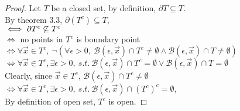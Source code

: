 \documentclass[]{article}
\newcommand{\ball}[2]{\mathcal{B}({#1}, {#2})}
\begin{document}
	\begin{proof}
		Let $T$ be a closed set, by definition, $\partial T \subseteq T$. \\
		By theorem 3.3, $\partial(T^c) \subseteq T$, \\
		$\iff \partial {T^c} \centernot \subseteq T^c$ \\
		$\iff$ no points in $T^c$ is boundary point \\
		$\iff \forall \vec{x} \in T^c,\ \neg(\forall \epsilon > 0,\ \ball{\epsilon}{\vec{x}} \cap T^c \neq \emptyset \land \ball{\epsilon}{\vec{x}} \cap T \neq \emptyset)$ \\
		$\iff \forall \vec{x} \in T^c, \exists \epsilon > 0,\ s.t.\ \ball{\epsilon}{\vec{x}} \cap T^c = \emptyset \lor \ball{\epsilon}{\vec{x}} \cap T = \emptyset$ \\
		Clearly, since $\vec{x} \in T^c$, $\ball{\epsilon}{\vec{x}} \cap T^c \neq \emptyset$ \\
		$\iff \forall \vec{x} \in T^c, \exists \epsilon > 0,\ s.t.\ \ball{\epsilon}{\vec{x}} \cap (T^c)^c = \emptyset$,\\
		By definition of open set, $T^c$ is open.
	\end{proof}
	
\end{document}
